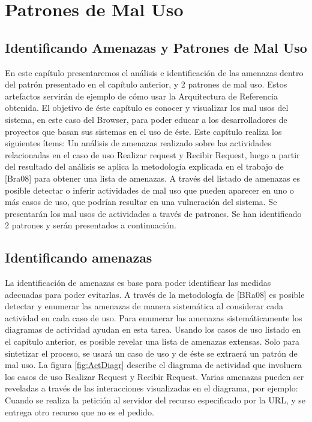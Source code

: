 \chapter{Patrones de Mal Uso}
\label{chap5:Misuse}

\section{Identificando Amenazas y Patrones de Mal Uso}
En este capítulo presentaremos el análisis e identificación de las amenazas dentro del patrón presentado en el capítulo anterior, y 2 patrones de mal uso. Estos artefactos servirán de ejemplo de cómo usar la Arquitectura de Referencia obtenida. El objetivo de éste capítulo es conocer y visualizar los mal usos del sistema, en este caso del Browser, para poder educar a los desarrolladores de proyectos que basan sus sistemas en el uso de éste.
Este capítulo realiza los siguientes ítems: Un análisis de amenazas realizado sobre las actividades relacionadas en el caso de uso Realizar request y Recibir Request, luego a partir del resultado del análisis se aplica la metodología explicada en el trabajo de [Bra08] para obtener una lista de amenazas. A través del listado de amenazas es posible detectar o inferir actividades de mal uso que pueden aparecer en uno o más casos de uso, que podrían resultar en una vulneración del sistema. Se presentarán los mal usos de actividades a través de patrones. Se han identificado 2 patrones y serán presentados a continuación.

\section{Identificando amenazas}
La identificación de amenazas es base para poder identificar las medidas adecuadas para poder evitarlas. A través de la metodología de [BRa08] es posible detectar y enumerar las amenazas de manera sistemática al considerar cada actividad en cada caso de uso. Para enumerar las amenazas sistemáticamente los diagramas de actividad ayudan en esta tarea.
Usando los casos de uso listado en el capítulo anterior, es posible revelar una lista de amenazas extensas. Solo para sintetizar el proceso, se usará un caso de uso y de éste se extraerá un patrón de mal uso.
La figura \ref{fig:ActDiagr} describe el diagrama de actividad que involucra los casos de uso Realizar Request y Recibir Request. Varias amenazas pueden ser reveladas a través de las interacciones visualizadas en el diagrama, por ejemplo: Cuando se realiza la petición al servidor del recurso especificado por la URL, y se entrega otro recurso que no es el pedido. 

